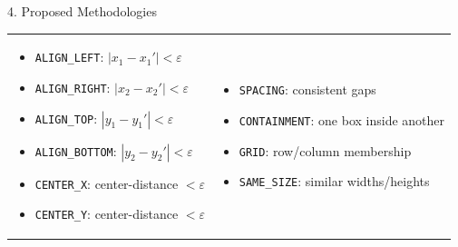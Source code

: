 \documentclass[final]{beamer}
\newlength{\colwidth}
\begin{document}
\begin{frame}[t]
\begin{columns}[t]
\begin{column}{\colwidth}
\begin{block}{4. Proposed Methodologies}
    \vspace{-6pt}
    \begingroup
    \setlength{\tabcolsep}{0pt}
    \justifying
    \begin{tabularx}{\linewidth}{@{} X X @{}}
    \begin{itemize}
      \item \texttt{ALIGN\_LEFT}: $|x_1-x_1'|<\varepsilon$
      \item \texttt{ALIGN\_RIGHT}: $|x_2-x_2'|<\varepsilon$
      \item \texttt{ALIGN\_TOP}: $|y_1-y_1'|<\varepsilon$
      \item \texttt{ALIGN\_BOTTOM}: $|y_2-y_2'|<\varepsilon$
      \item \texttt{CENTER\_X}: center-distance $<\varepsilon$
      \item \texttt{CENTER\_Y}: center-distance $<\varepsilon$
    \end{itemize}
    &
    \begin{itemize}
      \item \texttt{SPACING}: consistent gaps
      \item \texttt{CONTAINMENT}: one box inside another
      \item \texttt{GRID}: row/column membership
      \item \texttt{SAME\_SIZE}: similar widths/heights
    \end{itemize}
    \end{tabularx}
    \endgroup


\end{block}
\end{column}
\end{columns}
\end{frame}
\end{document}
